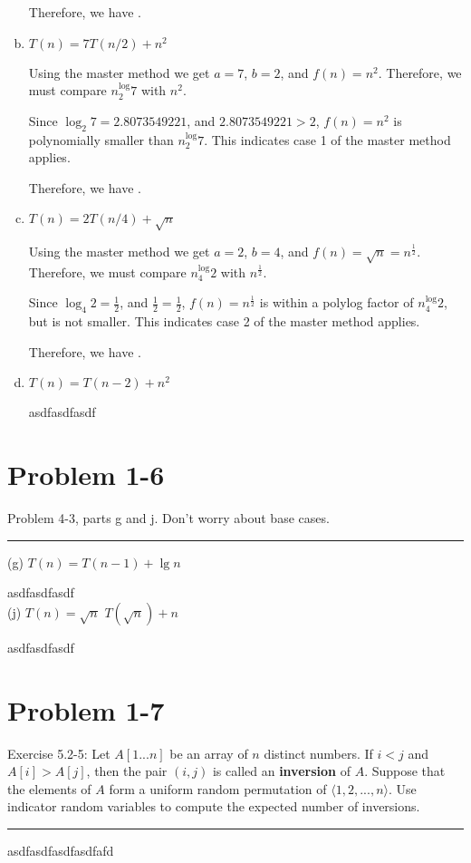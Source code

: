 \documentclass[11pt]{article}
\def\separateline{\medskip\hrule\medskip}
\begin{document}
\begin{enumerate}[(a)]
Therefore, we have .\\


\item $T(n) = 7T(n/2) + n^2$


Using the master method we get $a = 7$, $b = 2$, and $f(n) = n^2$. Therefore, we must compare $n^\log_2{7}$ with $n^2$.

Since $\log_2{7} = 2.8073549221$, and $2.8073549221 > 2$, $f(n) = n^2$ is polynomially smaller than $n^\log_2{7}$. This indicates case 1 of the master method applies.

Therefore, we have .\\


\item $T(n) = 2T(n/4) + \sqrt{n}$


Using the master method we get $a = 2$, $b = 4$, and $f(n) = \sqrt{n} = n^\frac{1}{2}$. Therefore, we must compare $n^\log_4{2}$ with $n^\frac{1}{2}$.

Since $\log_4{2} = \frac{1}{2}$, and $\frac{1}{2} = \frac{1}{2}$, $f(n) = n^\frac{1}{2}$ is within a polylog factor of $n^\log_4{2}$, but is not smaller. This indicates case 2 of the master method applies.

Therefore, we have .\\


\item $T(n) = T(n - 2) + n^2$


asdfasdfasdf
\end{enumerate}

\newpage

\section{Problem 1-6}
Problem 4-3, parts g and j. Don’t worry about base cases.
\separateline

\hspace*{6mm} (g)  $T(n) = T(n - 1) + \lg{n}$

\hspace*{12mm} asdfasdfasdf\\

\hspace*{6mm} (j)  $T(n) = \sqrt{n}$ \hspace $T(\sqrt{n}) + n$

\hspace*{12mm} asdfasdfasdf\\


 \newpage

 \section{Problem 1-7}
 Exercise 5.2-5: Let $A[1...n]$ be an array of $n$ distinct numbers. If $i < j$ and $A[i] > A[j]$, then the pair $(i,j)$ is called an \textbf{inversion} of $A$. Suppose that the elements of $A$ form a uniform random permutation of $\langle1,2,...,n\rangle$. Use indicator random variables to compute the expected number of inversions.
 \separateline

 asdfasdfasdfasdfafd
\end{document}
